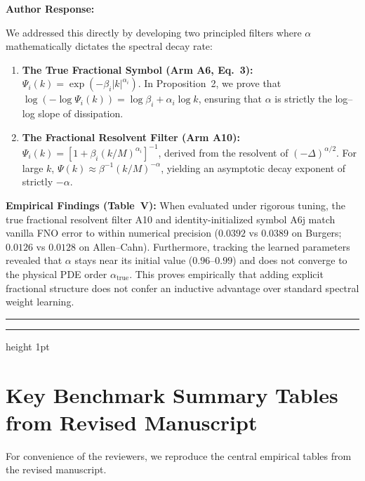 \documentclass[11pt,a4paper]{article}
\newenvironment{authorresponse}{%
  \vspace{1mm}\par\noindent
  \textbf{\color{navyblue}Author Response:}\par\vspace{1.5mm}
}{%
  \vspace{3mm}\par\noindent\rule{\textwidth}{0.3pt}\vspace{2mm}
}
\begin{document}
\begin{authorresponse}
We addressed this directly by developing two principled filters where $\alpha$ mathematically dictates the spectral decay rate:
\begin{enumerate}
  \item \textbf{The True Fractional Symbol (Arm A6, Eq.~3):} $\Psi_i(k) = \exp(-\beta_i |k|^{\alpha_i})$. In Proposition~2, we prove that $\log(-\log \Psi_i(k)) = \log \beta_i + \alpha_i \log k$, ensuring that $\alpha$ is strictly the log--log slope of dissipation.
  \item \textbf{The Fractional Resolvent Filter (Arm A10):} $\Psi_i(k) = [1 + \beta_i (k/M)^{\alpha_i}]^{-1}$, derived from the resolvent of $(-\Delta)^{\alpha/2}$. For large $k$, $\Psi(k) \approx \beta^{-1} (k/M)^{-\alpha}$, yielding an asymptotic decay exponent of strictly $-\alpha$.
\end{enumerate}
\textbf{Empirical Findings (Table~V):} When evaluated under rigorous tuning, the true fractional resolvent filter A10 and identity-initialized symbol A6j match vanilla FNO error to within numerical precision ($0.0392$ vs $0.0389$ on Burgers; $0.0126$ vs $0.0128$ on Allen--Cahn). Furthermore, tracking the learned parameters revealed that $\alpha$ stays near its initial value ($0.96$--$0.99$) and does not converge to the physical PDE order $\alpha_{\mathrm{true}}$. This proves empirically that adding explicit fractional structure does not confer an inductive advantage over standard spectral weight learning.
\end{authorresponse}

\vspace{3mm}
\hrule height 1pt
\vspace{3mm}

\section*{Key Benchmark Summary Tables from Revised Manuscript}

For convenience of the reviewers, we reproduce the central empirical tables from the revised manuscript.
\end{document}
